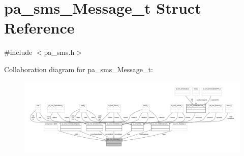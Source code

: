 \hypertarget{structpa__sms___message__t}{}\section{pa\+\_\+sms\+\_\+\+Message\+\_\+t Struct Reference}
\label{structpa__sms___message__t}


{\ttfamily \#include $<$pa\+\_\+sms.\+h$>$}



Collaboration diagram for pa\+\_\+sms\+\_\+\+Message\+\_\+t\+:
\nopagebreak
\begin{figure}[H]
\begin{center}
\leavevmode
\includegraphics[width=350pt]{structpa__sms___message__t__coll__graph}
\end{center}
\end{figure}

